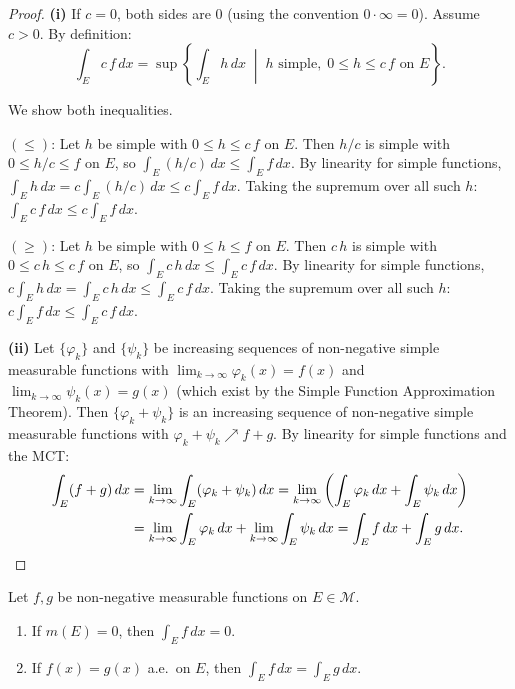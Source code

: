 \documentclass[11pt]{report}
\begin{document}
\begin{proof}
\textbf{(i)} If $c = 0$, both sides are $0$ (using the convention $0 \cdot \infty = 0$). Assume $c > 0$. By definition:
\[
\int_E c\,f\,dx = \sup\left\{\int_E h\,dx \;\middle|\; h \text{ simple},\; 0 \leq h \leq c\,f \text{ on } E\right\}.
\]

We show both inequalities.

\textit{$(\leq)$}: Let $h$ be simple with $0 \leq h \leq c\,f$ on $E$. Then $h/c$ is simple with $0 \leq h/c \leq f$ on $E$, so $\int_E (h/c)\,dx \leq \int_E f\,dx$. By linearity for simple functions, $\int_E h\,dx = c\int_E (h/c)\,dx \leq c\int_E f\,dx$. Taking the supremum over all such $h$: $\int_E c\,f\,dx \leq c\int_E f\,dx$.

\textit{$(\geq)$}: Let $h$ be simple with $0 \leq h \leq f$ on $E$. Then $c\,h$ is simple with $0 \leq c\,h \leq c\,f$ on $E$, so $\int_E c\,h\,dx \leq \int_E c\,f\,dx$. By linearity for simple functions, $c\int_E h\,dx = \int_E c\,h\,dx \leq \int_E c\,f\,dx$. Taking the supremum over all such $h$: $c\int_E f\,dx \leq \int_E c\,f\,dx$.

\textbf{(ii)} Let $\{\varphi_k\}$ and $\{\psi_k\}$ be increasing sequences of non-negative simple measurable functions with $\lim_{k \to \infty} \varphi_k(x) = f(x)$ and $\lim_{k \to \infty} \psi_k(x) = g(x)$ (which exist by the Simple Function Approximation Theorem). Then $\{\varphi_k + \psi_k\}$ is an increasing sequence of non-negative simple measurable functions with $\varphi_k + \psi_k \nearrow f + g$. By linearity for simple functions and the MCT:
\begin{align*}
\int_E (f + g)\,dx &= \lim_{k \to \infty} \int_E (\varphi_k + \psi_k)\,dx = \lim_{k \to \infty} \left(\int_E \varphi_k\,dx + \int_E \psi_k\,dx\right) \\
&= \lim_{k \to \infty} \int_E \varphi_k\,dx + \lim_{k \to \infty} \int_E \psi_k\,dx = \int_E f\,dx + \int_E g\,dx. \qedhere
\end{align*}
\end{proof}

\begin{propbox}
Let $f, g$ be non-negative measurable functions on $E \in \mathcal{M}$.
\begin{enumerate}[label=(\roman*)]
\item If $m(E) = 0$, then $\int_E f\,dx = 0$.
\item If $f(x) = g(x)$ a.e.\ on $E$, then $\int_E f\,dx = \int_E g\,dx$.
\end{enumerate}
\end{propbox}
\end{document}
